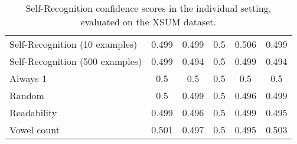 \begin{table}[h]
\begin{tabular}{l|ccccc}
    Self-Recognition (10 examples)             & 0.499      & 0.499      & 0.5        & 0.506      & 0.499      \\
    Self-Recognition (500 examples)            & 0.499      & 0.494      & 0.5        & 0.499      & 0.494      \\
    Always 1                           & 0.5        & 0.5        & 0.5        & 0.5        & 0.5        \\
    Random                             & 0.5        & 0.499      & 0.5        & 0.496      & 0.499      \\
    Readability                        & 0.499      & 0.496      & 0.5        & 0.499      & 0.495      \\
    Vowel count                        & 0.501      & 0.497      & 0.5        & 0.495      & 0.503      \\
    \end{tabular}
    \caption{Self-Recognition confidence scores in the individual setting, evaluated on the XSUM dataset.}
    \label{table:individual_self_rec_xsum}
\end{table}


